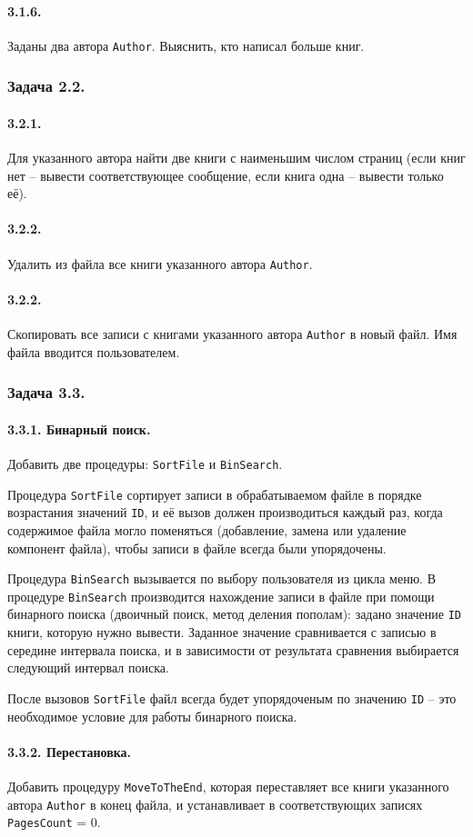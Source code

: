 \documentclass[12pt,a4paper]{report}
\begin{document}
\paragraph{3.1.6.} Заданы два автора \texttt{Author}. Выяснить, кто написал больше книг.

\subsubsection*{Задача 2.2.}
\paragraph{3.2.1.} Для указанного автора найти две книги с наименьшим числом страниц (если книг нет -- вывести соответствующее сообщение, если книга одна -- вывести только её).
\paragraph{3.2.2.} Удалить из файла все книги указанного автора \texttt{Author}.
\paragraph{3.2.2.} Скопировать все записи с книгами указанного автора \texttt{Author} в новый файл. Имя файла вводится пользователем.


\subsubsection*{Задача 3.3.}
\paragraph{3.3.1. Бинарный поиск.} Добавить две процедуры: \texttt{SortFile} и \texttt{BinSearch}.

Процедура \texttt{SortFile} сортирует записи в обрабатываемом файле в порядке возрастания значений \texttt{ID}, и её вызов должен производиться каждый раз, когда содержимое файла могло поменяться (добавление, замена или удаление компонент файла), чтобы записи в файле всегда были упорядочены.

Процедура \texttt{BinSearch} вызывается по выбору пользователя из цикла меню. В процедуре \texttt{BinSearch} производится нахождение записи в файле при помощи бинарного поиска (двоичный поиск, метод деления пополам): задано значение \texttt{ID} книги, которую нужно вывести. Заданное значение сравнивается с записью в середине интервала поиска, и в зависимости от результата сравнения выбирается следующий интервал поиска.

После вызовов \texttt{SortFile} файл всегда будет упорядоченым по значению \texttt{ID} -- это необходимое условие для работы бинарного поиска.

\paragraph{3.3.2. Перестановка.} Добавить процедуру \texttt{MoveToTheEnd}, которая переставляет все книги указанного автора \texttt{Author} в конец файла, и устанавливает в соответствующих записях \texttt{PagesCount} = 0.
\end{document}

